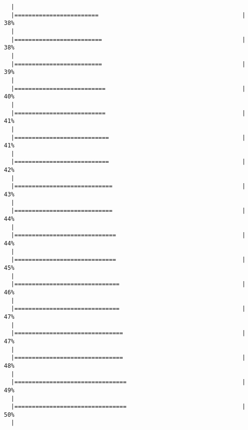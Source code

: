 \documentclass[a4paper]{article}
\begin{document}
\begin{verbatim}
  |                                                                       
  |========================                                         |  38%
  |                                                                       
  |=========================                                        |  38%
  |                                                                       
  |=========================                                        |  39%
  |                                                                       
  |==========================                                       |  40%
  |                                                                       
  |==========================                                       |  41%
  |                                                                       
  |===========================                                      |  41%
  |                                                                       
  |===========================                                      |  42%
  |                                                                       
  |============================                                     |  43%
  |                                                                       
  |============================                                     |  44%
  |                                                                       
  |=============================                                    |  44%
  |                                                                       
  |=============================                                    |  45%
  |                                                                       
  |==============================                                   |  46%
  |                                                                       
  |==============================                                   |  47%
  |                                                                       
  |===============================                                  |  47%
  |                                                                       
  |===============================                                  |  48%
  |                                                                       
  |================================                                 |  49%
  |                                                                       
  |================================                                 |  50%
  |                                                                       

\end{verbatim}
\end{document}
